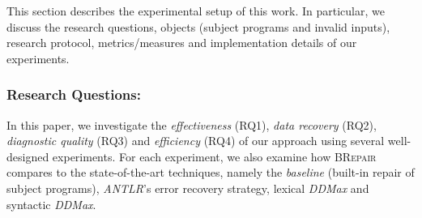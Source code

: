 \documentclass[sigconf,review,anonymous]{acmart}
\newcommand{\approach}{\textsc{BRepair}\xspace}
\newcommand{\ddmax}{\textit{DDMax}\xspace}
\newcommand{\brepair}{\textit{BRepair}\xspace}
\begin{document}
This section describes the experimental setup of this work. In particular, we discuss %
the research questions, objects (subject programs and invalid inputs), research protocol, metrics/measures and implementation details of our experiments. %


\subsubsection*{\bf Research Questions: }
In this paper, we investigate the \textit{effectiveness} (RQ1), \textit{data recovery} (RQ2), \textit{diagnostic quality} (RQ3) and \textit{efficiency} (RQ4) of our approach using several well-designed experiments. For each experiment, we also examine how \approach compares to the state-of-the-art techniques, namely the \textit{baseline} (built-in repair of subject programs), \textit{ANTLR}'s error recovery strategy, lexical \ddmax and syntactic \ddmax.
\end{document}
